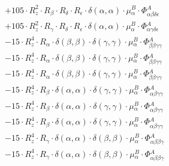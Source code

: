 \documentclass{article}
\begin{document}
\begin{subequations}
\begin{gather}
\begin{array}{c}
 \\[0.2em] 		 + 105 \cdot R_{z}^{2} \cdot R_{\beta{}} \cdot R_{\delta{}} \cdot R_{\epsilon{}} \cdot \delta{}\left(\alpha{}, \alpha{}\right) \cdot \mu{}^{B}_{\alpha{}} \cdot \Phi{}^{A}_{\alpha{}\beta{}\delta{}\epsilon{}} 
 \\[0.2em] 		 + 105 \cdot R_{z}^{2} \cdot R_{\gamma{}} \cdot R_{\delta{}} \cdot R_{\epsilon{}} \cdot \delta{}\left(\alpha{}, \alpha{}\right) \cdot \mu{}^{B}_{\alpha{}} \cdot \Phi{}^{A}_{\alpha{}\gamma{}\delta{}\epsilon{}} 
 \\[0.2em] 		 - 15 \cdot R_{z}^{4} \cdot R_{\alpha{}} \cdot \delta{}\left(\beta{}, \beta{}\right) \cdot \delta{}\left(\gamma{}, \gamma{}\right) \cdot \mu{}^{B}_{\alpha{}} \cdot \Phi{}^{A}_{\beta{}\beta{}\gamma{}\gamma{}} 
 \\[0.2em] 		 - 15 \cdot R_{z}^{4} \cdot R_{\alpha{}} \cdot \delta{}\left(\beta{}, \beta{}\right) \cdot \delta{}\left(\gamma{}, \gamma{}\right) \cdot \mu{}^{B}_{\alpha{}} \cdot \Phi{}^{A}_{\beta{}\beta{}\gamma{}\gamma{}} 
 \\[0.2em] 		 - 15 \cdot R_{z}^{4} \cdot R_{\alpha{}} \cdot \delta{}\left(\beta{}, \beta{}\right) \cdot \delta{}\left(\gamma{}, \gamma{}\right) \cdot \mu{}^{B}_{\alpha{}} \cdot \Phi{}^{A}_{\beta{}\beta{}\gamma{}\gamma{}} 
 \\[0.2em] 		 - 15 \cdot R_{z}^{4} \cdot R_{\beta{}} \cdot \delta{}\left(\alpha{}, \alpha{}\right) \cdot \delta{}\left(\gamma{}, \gamma{}\right) \cdot \mu{}^{B}_{\alpha{}} \cdot \Phi{}^{A}_{\alpha{}\beta{}\gamma{}\gamma{}} 
 \\[0.2em] 		 - 15 \cdot R_{z}^{4} \cdot R_{\beta{}} \cdot \delta{}\left(\alpha{}, \alpha{}\right) \cdot \delta{}\left(\gamma{}, \gamma{}\right) \cdot \mu{}^{B}_{\alpha{}} \cdot \Phi{}^{A}_{\alpha{}\beta{}\gamma{}\gamma{}} 
 \\[0.2em] 		 - 15 \cdot R_{z}^{4} \cdot R_{\beta{}} \cdot \delta{}\left(\alpha{}, \alpha{}\right) \cdot \delta{}\left(\gamma{}, \gamma{}\right) \cdot \mu{}^{B}_{\alpha{}} \cdot \Phi{}^{A}_{\alpha{}\beta{}\gamma{}\gamma{}} 
 \\[0.2em] 		 - 15 \cdot R_{z}^{4} \cdot R_{\gamma{}} \cdot \delta{}\left(\alpha{}, \alpha{}\right) \cdot \delta{}\left(\beta{}, \beta{}\right) \cdot \mu{}^{B}_{\alpha{}} \cdot \Phi{}^{A}_{\alpha{}\beta{}\beta{}\gamma{}} 
 \\[0.2em] 		 - 15 \cdot R_{z}^{4} \cdot R_{\gamma{}} \cdot \delta{}\left(\alpha{}, \alpha{}\right) \cdot \delta{}\left(\beta{}, \beta{}\right) \cdot \mu{}^{B}_{\alpha{}} \cdot \Phi{}^{A}_{\alpha{}\beta{}\beta{}\gamma{}} 

\end{array}
\end{gather}
\end{subequations}
\end{document}
